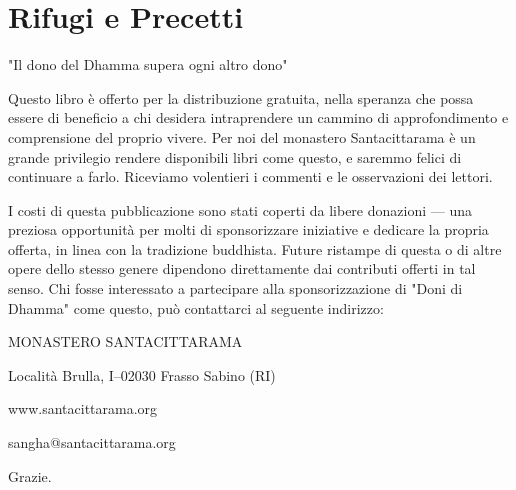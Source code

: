 \documentclass[11pt,twoside,final]{memoir}
\begin{document}

\backmatter



\chapter{Rifugi e Precetti}
%


\newpage

"Il dono del Dhamma supera ogni altro dono"

Questo libro è offerto per la distribuzione gratuita, nella speranza che
possa essere di beneficio a chi desidera intraprendere un cammino di
approfondimento e comprensione del proprio vivere. Per noi del monastero
Santacittarama è un grande privilegio rendere disponibili libri come
questo, e saremmo felici di continuare a farlo. Riceviamo volentieri i
commenti e le osservazioni dei lettori.

I costi di questa pubblicazione sono stati coperti da libere donazioni —
una preziosa opportunità per molti di sponsorizzare iniziative e
dedicare la propria offerta, in linea con la tradizione buddhista.
Future ristampe di questa o di altre opere dello stesso genere dipendono
direttamente dai contributi offerti in tal senso. Chi fosse interessato
a partecipare alla sponsorizzazione di "Doni di Dhamma" come questo, può
contattarci al seguente indirizzo:

MONASTERO SANTACITTARAMA

Località Brulla, I–02030 Frasso Sabino (RI)

www.santacittarama.org

sangha@santacittarama.org

Grazie.

\cleartorecto
\thispagestyle{plain}


\emptysheet
\end{document}
